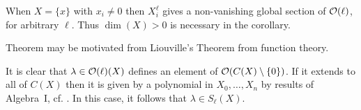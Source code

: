 \documentclass[a4paper,parskip=half,numbers=enddot, DIV=12]{scrreprt}
\begin{document}
\begin{rem*}
    \begin{alphanumerate}
        \item 
            When $X=\{x\}$ with $x_i\neq 0$ then $X_i^\ell$ gives a non-vanishing global section of $\mathcal{O}(\ell)$, for arbitrary $\ell$. Thus $\dim(X)>0$ is necessary in the corollary.
        \item 
            Theorem  may be motivated from Liouville's Theorem from function theory.
        \item   
            It is clear that $\lambda\in \mathcal{O}(\ell)(X)$ defines an element of $\mathcal{O}(C(X)\setminus\{0\})$. If it extends to all of $C(X)$ then it is given by a polynomial in $X_0,\ldots, X_n$ by results of Algebra~I, cf. \cite[Proposition~2.2.2]{alg1}. In this case, it follows that $\lambda\in S_\ell(X)$.
            

\end{alphanumerate}
\end{rem*}
\end{document}
